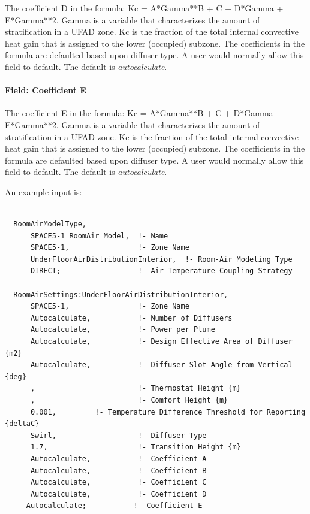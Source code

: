The coefficient D in the formula: Kc = A*Gamma**B + C + D*Gamma + E*Gamma**2. Gamma is a variable that characterizes the amount of stratification in a UFAD zone. Kc is the fraction of the total internal convective heat gain that is assigned to the lower (occupied) subzone. The coefficients in the formula are defaulted based upon diffuser type. A user would normally allow this field to default. The default is \emph{autocalculate}.

\paragraph{Field: Coefficient E}\label{field-coefficient-e}

The coefficient E in the formula: Kc = A*Gamma**B + C + D*Gamma + E*Gamma**2. Gamma is a variable that characterizes the amount of stratification in a UFAD zone. Kc is the fraction of the total internal convective heat gain that is assigned to the lower (occupied) subzone. The coefficients in the formula are defaulted based upon diffuser type. A user would normally allow this field to default. The default is \emph{autocalculate}.

An example input is:

\begin{lstlisting}

  RoomAirModelType,
      SPACE5-1 RoomAir Model,  !- Name
      SPACE5-1,                !- Zone Name
      UnderFloorAirDistributionInterior,  !- Room-Air Modeling Type
      DIRECT;                  !- Air Temperature Coupling Strategy

  RoomAirSettings:UnderFloorAirDistributionInterior,
      SPACE5-1,                !- Zone Name
      Autocalculate,           !- Number of Diffusers
      Autocalculate,           !- Power per Plume
      Autocalculate,           !- Design Effective Area of Diffuser {m2}
      Autocalculate,           !- Diffuser Slot Angle from Vertical {deg}
      ,                        !- Thermostat Height {m}
      ,                        !- Comfort Height {m}
      0.001,         !- Temperature Difference Threshold for Reporting {deltaC}
      Swirl,                   !- Diffuser Type
      1.7,                     !- Transition Height {m}
      Autocalculate,           !- Coefficient A
      Autocalculate,           !- Coefficient B
      Autocalculate,           !- Coefficient C
      Autocalculate,           !- Coefficient D
     Autocalculate;           !- Coefficient E
\end{lstlisting}

